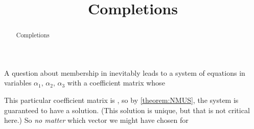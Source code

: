 \documentclass{ximera}
\title{Completions}
\begin{document}
\begin{abstract}
  Completions
\end{abstract}
\maketitle


\begin{example}

  \begin{question}
    A question about membership in inevitably leads to a
    system of  equations in  variables
    $\alpha_1,\,\alpha_2,\,\alpha_3$ with a coefficient matrix whose

    This particular coefficient matrix is
    , so by
    \ref{theorem:NMUS}, the system is guaranteed to have a solution.
    (This solution is unique, but that is not critical here.)  So
    \textit{no matter} which vector we might have chosen for
  \end{question}
\end{example}
\end{document}
